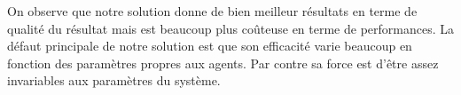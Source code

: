 On observe que notre solution donne de bien meilleur résultats en terme de qualité du résultat mais est beaucoup plus coûteuse en terme de performances. La défaut principale de notre solution est que son efficacité varie beaucoup en fonction des paramètres propres aux agents. Par contre sa force est d'être assez invariables aux paramètres du système.

